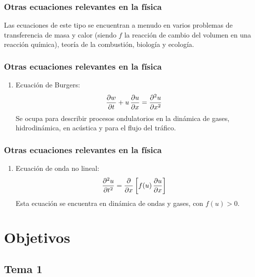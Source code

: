\documentclass[12pt]{beamer}
\begin{document}
\begin{frame}
\frametitle{Otras ecuaciones relevantes en la física}
Las ecuaciones de este tipo se encuentran a menudo en varios problemas de transferencia de masa y calor (siendo $f$ la reacción de cambio del volumen en una reacción química), teoría de la combustión, biología y ecología.
\end{frame}
\begin{frame}
\frametitle{Otras ecuaciones relevantes en la física}
\begin{enumerate}[<+->]
\conti
\item Ecuación de Burgers:
\begin{align*}
\pdv{w}{t} + u \, \pdv{u}{x} = \pdv[2]{u}{x}
\end{align*}
Se ocupa para describir procesos ondulatorios en la dinámica de gases, hidrodinámica, en acústica y para el flujo del tráfico.
\seti
\end{enumerate}
\end{frame}
\begin{frame}
\frametitle{Otras ecuaciones relevantes en la física}
\begin{enumerate}[<+->]
\conti
\item Ecuación de onda no lineal:
\begin{align*}
\pdv[2]{u}{t} = \pdv{x} \left[ f(u) \, \pdv{u}{x} \right]
\end{align*}
Esta ecuación se encuentra en dinámica de ondas y gases, con $f(u) > 0$.
\end{enumerate}
\end{frame}

\section{Objetivos}
\subsection{Tema 1}
\end{document}
